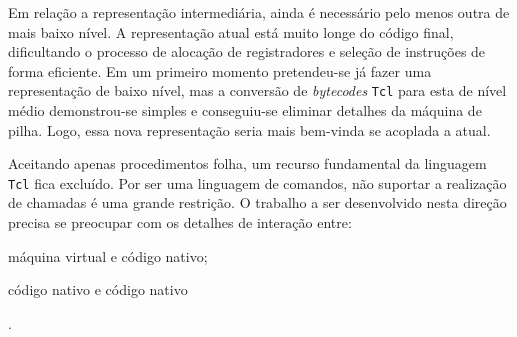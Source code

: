 Em relação a representação intermediária, ainda é necessário pelo
menos outra de mais baixo nível. A representação atual está muito
longe do código final, dificultando o processo de alocação de
registradores e seleção de instruções de forma eficiente.
Em um primeiro momento pretendeu-se já fazer uma representação de
baixo nível, mas a conversão de \textit{bytecodes} \texttt{Tcl} para
esta de nível médio demonstrou-se simples e conseguiu-se eliminar
detalhes da máquina de pilha.
Logo, essa nova representação seria mais bem-vinda  se acoplada a
atual.

Aceitando apenas procedimentos folha, um recurso fundamental da
linguagem \texttt{Tcl} fica excluído. Por ser uma linguagem de
comandos, não suportar a realização de chamadas é uma grande
restrição. O trabalho a ser desenvolvido nesta direção precisa se
preocupar com os detalhes de interação entre: \begin{inparaenum} \item
  máquina virtual e código nativo; \item código nativo e código
  nativo\end{inparaenum}.
